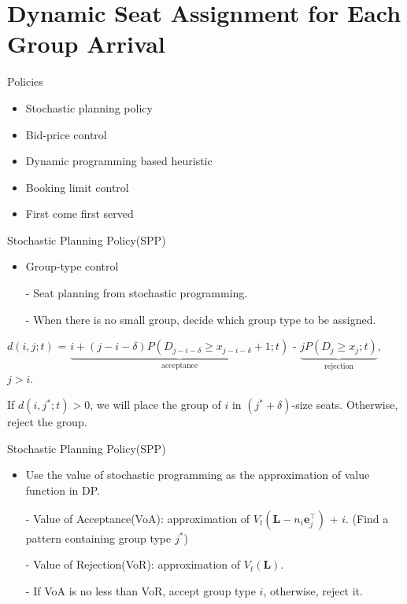 
\section{Dynamic Seat Assignment for Each Group Arrival}
    \frame{\sectionpage}
    \begin{frame}{Policies}
      \begin{itemize}
        \item Stochastic planning policy
        \item Bid-price control
        \item Dynamic programming based heuristic
        \item Booking limit control
        \item First come first served
      \end{itemize}
    \end{frame}

    \begin{frame}{Stochastic Planning Policy(SPP)}
      \begin{itemize}
        \item Group-type control
        \item[-] Seat planning from stochastic programming.
        \item[-] When there is no small group, decide which group type to be assigned.
      \end{itemize}
      \vspace*{1cm}
      \small
      $d(i, j; t)$ = $\underbrace{i + (j-i-\delta)P(D_{j-i-\delta} \geq x_{j-i-\delta}+1; t)}_{\text{acceptance}}$ - $\underbrace{j P(D_{j} \geq x_{j}; t)}_{\text{rejection}}$, $j > i$.
      \vspace*{1cm}

      If $d(i, j^{*}; t) > 0$, we will place the group of $i$ in $(j^{*} + \delta)$-size seats. Otherwise, reject the group.
    \end{frame}

    \begin{frame}{Stochastic Planning Policy(SPP)}
      \begin{itemize}
        \item Use the value of stochastic programming as the approximation of value function in DP.

        \item[-] Value of Acceptance(VoA): approximation of $V_{t} (\mathbf{L}-n_i \mathbf{e}_{j}^{\top})$ + $i$. (Find a pattern containing group type $j^{*}$)
        
        \item[-] Value of Rejection(VoR): approximation of $V_{t} (\mathbf{L})$.

        \item[-] If VoA is no less than VoR, accept group type $i$, otherwise, reject it.
      \end{itemize}
    \end{frame}

